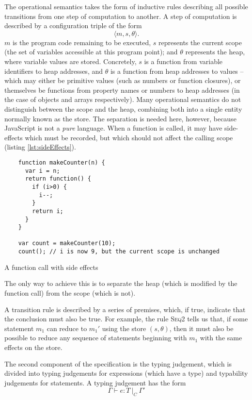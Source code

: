 \documentclass[12pt,a4paper,twoside,openright]{report}
\begin{document}
The operational semantics takes the form of \color{red}{60} inductive rules describing
all possible transitions from one step of computation to another. A step of
computation is described by a configuration triple of the form $$\langle m,s,\theta\rangle.$$
$m$ is the program code remaining to be executed, $s$ represents the current
scope (the set of variables accessible at this program point); and $\theta$
represents the heap, where variable values are stored. Concretely, $s$ is a
function from variable identifiers to heap addresses, and $\theta$ is a
function from heap addresses to values -- which may either be primitive values
(such as numbers or function closures), or themselves be functions from
property names or numbers to heap addresses (in the case of objects and arrays
respectively).  Many operational semantics do not distinguish between the scope
and the heap, combining both into a single entity normally known as the store.
The separation is needed here, however, because JavaScript is not a
\textit{pure} language.  When a function is called, it may have side-effects
which must be recorded, but which should not affect the calling scope (listing
\ref{lst:sideEffects}).
\begin{program}[h]
  \begin{verbatim}
	function makeCounter(n) {
	  var i = n;
	  return function() {
		if (i>0) {
		  i--;
		}
		return i;
	  }
	}

	var count = makeCounter(10);
	count(); // i is now 9, but the current scope is unchanged
  \end{verbatim}
  \caption{A function call with side effects}\label{lst:sideEffects}
\end{program}
The only way to achieve this is to separate the heap (which is modified by
the function call) from the scope (which is not).

A transition rule is described by a series of premises, which, if true,
indicate that the conclusion must also be true. For example, the rule
\textsc{Seq2} tells us that, if some statement $m_1$ can reduce to $m_1'$ using
the store $(s,\theta)$, then it must also be possible to reduce any sequence of
statements beginning with $m_1$ with the same effects on the store.

The second component of the specification is the typing judgement, which is
divided into typing judgements for expressions (which have a type) and
typability judgements for statements. A typing judgement has the form 
$$\Gamma\vdash e : T\ |_C\ \Gamma'$$
\end{document}
